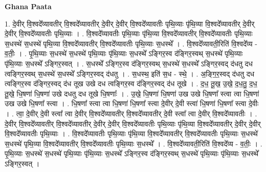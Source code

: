 \documentclass[17pt]{extarticle}
\begin{document}
\textbf{Ghana Paata } \newline

1. दे॒वीर् वि॒श्वदे᳚व्यावतीर् वि॒श्वदे᳚व्यावतीर् दे॒वीर् दे॒वीर् वि॒श्वदे᳚व्यावतीः पृथि॒व्याः पृ॑थि॒व्या वि॒श्वदे᳚व्यावतीर् दे॒वीर् दे॒वीर् वि॒श्वदे᳚व्यावतीः पृथि॒व्याः । . वि॒श्वदे᳚व्यावतीः पृथि॒व्याः पृ॑थि॒व्या वि॒श्वदे᳚व्यावतीर् वि॒श्वदे᳚व्यावतीः पृथि॒व्याः स॒धस्थे॑ स॒धस्थे॑ पृथि॒व्या वि॒श्वदे᳚व्यावतीर् वि॒श्वदे᳚व्यावतीः पृथि॒व्याः स॒धस्थे᳚ । . वि॒श्वदे᳚व्यावती॒रिति॑ वि॒श्वदे᳚व्य - व॒तीः॒ । . पृ॒थि॒व्याः स॒धस्थे॑ स॒धस्थे॑ पृथि॒व्याः पृ॑थि॒व्याः स॒धस्थे᳚ ऽङ्गिर॒स्व द॑ङ्गिर॒स्वथ् स॒धस्थे॑ पृथि॒व्याः पृ॑थि॒व्याः स॒धस्थे᳚ ऽङ्गिर॒स्वत् । . स॒धस्थे᳚ ऽङ्गिर॒स्व द॑ङ्गिर॒स्वथ् स॒धस्थे॑ स॒धस्थे᳚ ऽङ्गिर॒स्वद् द॑धतु दध त्वङ्गिर॒स्वथ् स॒धस्थे॑ स॒धस्थे᳚ ऽङ्गिर॒स्वद् द॑धतु । . स॒धस्थ॒ इति॑ स॒ध - स्थे॒ । . अ॒ङ्गि॒र॒स्वद् द॑धतु दध त्वङ्गिर॒स्व द॑ङ्गिर॒स्वद् द॑ध तूख उखे दध त्वङ्गिर॒स्व द॑ङ्गिर॒स्वद् द॑ध तूखे । . द॒ध॒ तू॒ख॒ उ॒खे॒ द॒ध॒तु॒ द॒ध॒ तू॒खे॒ धि॒षणा॑ धि॒षणा॑ उखे दधतु दध तूखे धि॒षणाः᳚ । . उ॒खे॒ धि॒षणा॑ धि॒षणा॑ उख उखे धि॒षणा᳚ स्त्वा त्वा धि॒षणा॑ उख उखे धि॒षणा᳚ स्त्वा । . धि॒षणा᳚ स्त्वा त्वा धि॒षणा॑ धि॒षणा᳚ स्त्वा दे॒वीर् दे॒वी स्त्वा॑ धि॒षणा॑ धि॒षणा᳚ स्त्वा दे॒वीः । . त्वा॒ दे॒वीर् दे॒वी स्त्वा᳚ त्वा दे॒वीर् वि॒श्वदे᳚व्यावतीर् वि॒श्वदे᳚व्यावतीर् दे॒वी स्त्वा᳚ त्वा दे॒वीर् वि॒श्वदे᳚व्यावतीः । . दे॒वीर् वि॒श्वदे᳚व्यावतीर् वि॒श्वदे᳚व्यावतीर् दे॒वीर् दे॒वीर् वि॒श्वदे᳚व्यावतीः पृथि॒व्याः पृ॑थि॒व्या वि॒श्वदे᳚व्यावतीर् दे॒वीर् दे॒वीर् वि॒श्वदे᳚व्यावतीः पृथि॒व्याः । . वि॒श्वदे᳚व्यावतीः पृथि॒व्याः पृ॑थि॒व्या वि॒श्वदे᳚व्यावतीर् वि॒श्वदे᳚व्यावतीः पृथि॒व्याः स॒धस्थे॑ स॒धस्थे॑ पृथि॒व्या वि॒श्वदे᳚व्यावतीर् वि॒श्वदे᳚व्यावतीः पृथि॒व्याः स॒धस्थे᳚ । . वि॒श्वदे᳚व्यावती॒रिति॑ वि॒श्वदे᳚व्य - व॒तीः॒ । . पृ॒थि॒व्याः स॒धस्थे॑ स॒धस्थे॑ पृथि॒व्याः पृ॑थि॒व्याः स॒धस्थे᳚ ऽङ्गिर॒स्व द॑ङ्गिर॒स्वथ् स॒धस्थे॑ पृथि॒व्याः पृ॑थि॒व्याः स॒धस्थे᳚ ऽङ्गिर॒स्वत् । \newline
\end{document}

